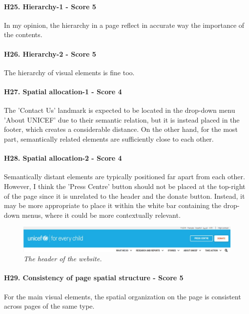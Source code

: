 \paragraph{H25. Hierarchy-1 - Score 5}	In my opinion, the hierarchy in a page reflect in accurate way the importance of the contents.
\newline
\paragraph{H26. Hierarchy-2 - Score 5}	The hierarchy of visual elements is fine too.
\newline
\paragraph{H27. Spatial allocation-1 - Score 4}	The 'Contact Us' landmark is expected to be located in the drop-down menu 'About UNICEF' due to their semantic relation, but it is instead placed in the footer, which creates a considerable distance.
On the other hand, for the most part, semantically related elements are sufficiently close to each other.
\newline
\paragraph{H28. Spatial allocation-2 - Score 4}	Semantically distant elements are typically positioned far apart from each other. However, I think the 'Press Centre' button should not be placed at the top-right of the page since it is unrelated to the header and the donate button. Instead, it may be more appropriate to place it within the white bar containing the drop-down menus, where it could be more contextually relevant.
\begin{figure}[!h]
	\begin{center}
		\includegraphics[width=\textwidth]{Picture17.jpg}
		\captionsetup{font=small}
		\caption{\textit{The header of the website.}}
	\end{center}
\end{figure}
\newline
\paragraph{H29. Consistency of page spatial structure - Score 5}	For the main visual elements, the spatial organization on the page is consistent across pages of the same type.
